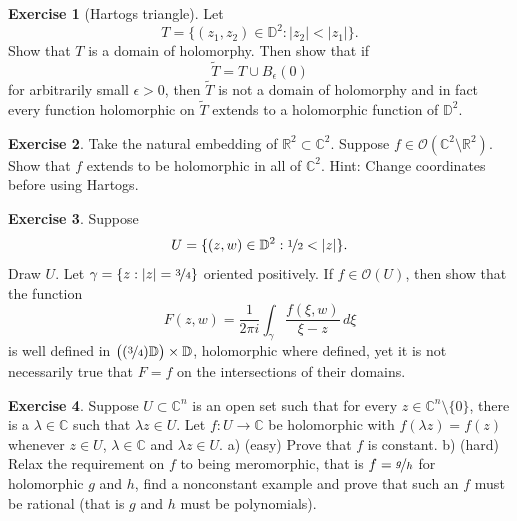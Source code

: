 \documentclass[12pt,openany]{book}
\newcommand{\sabs}[1]{\lvert {#1} \rvert}
\newcommand{\C}{{\mathbb{C}}}
\newcommand{\R}{{\mathbb{R}}}
\newcommand{\D}{{\mathbb{D}}}
\newcommand{\sO}{{\mathcal{O}}}
\newcommand{\myindex}[1]{#1\index{#1}}
\theoremstyle{plain}
\theoremstyle{remark}
\theoremstyle{definition}
\newenvironment{exbox}{%
    \def\FrameCommand{\vrule width 1pt \relax\hspace {10pt}}%
    \MakeFramed {\advance \hsize -\width \FrameRestore }%
}{%
    \endMakeFramed
}
\theoremstyle{exercise}
\newtheorem{exercise}{Exercise}[section]
\theoremstyle{example}
\begin{document}
\begin{exbox}
\begin{exercise}[\myindex{Hartogs triangle}]\label{exercise:hartogstriangle}
Let
\begin{equation*}
T = \{ (z_1,z_2) \in \D^2 : \sabs{z_2} < \sabs{z_1} \} .
\end{equation*}
Show that $T$ is a domain of holomorphy.  Then show that if
\begin{equation*}
\widetilde{T} = T \cup B_{\epsilon}(0)
\end{equation*}
for arbitrarily small $\epsilon > 0$, then $\widetilde{T}$ is not a domain
of holomorphy and in fact every function holomorphic on $\widetilde{T}$
extends to a holomorphic function of $\D^2$.
\end{exercise}

\begin{exercise} \label{exercise:C2minusR2}
Take the natural embedding of $\R^2 \subset \C^2$.  Suppose 
$f \in \sO(\C^2 \setminus \R^2)$.  Show that $f$ extends to be holomorphic
in all of $\C^2$.  Hint: Change coordinates before using Hartogs.
\end{exercise}

\begin{exercise}
Suppose 
\begin{equation*}
U = \{ (z,w) \in \D^2 : \nicefrac{1}{2} < \sabs{z} \} .
\end{equation*}
Draw $U$.  
Let $\gamma = \{ z : \sabs{z} = \nicefrac{3}{4} \}$ oriented positively.
If $f \in \sO(U)$, then show that the function
\begin{equation*}
F(z,w)
=
\frac{1}{2\pi i}
\int_\gamma \frac{f(\xi,w)}{\xi-z} \, d\xi
\end{equation*}
is well defined in
$\bigl( (\nicefrac{3}{4}) \D \bigr) \times \D$, holomorphic where defined, yet
it is not necessarily true that $F = f$ on the intersections of their
domains.
\end{exercise}

\begin{exercise}
Suppose $U \subset \C^n$ is an open set such that for every
$z \in \C^n \setminus \{ 0 \}$, there is a $\lambda \in \C$ such that
$\lambda z \in U$.  Let $f \colon U \to \C$ be holomorphic with
$f(\lambda z) = f(z)$ whenever $z \in U$, $\lambda \in \C$ and $\lambda z
\in U$.  a) (easy) Prove that $f$ is constant.  b) (hard) Relax the requirement on
$f$ to being meromorphic, that is $f = \nicefrac{g}{h}$
for holomorphic $g$ and $h$,
find a nonconstant example and prove that such an $f$ must be rational (that
is $g$ and $h$ must be polynomials).
\end{exercise}
\end{exbox}
\end{document}
